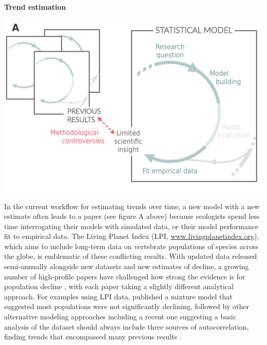 \documentclass[11pt]{article}
\begin{document}
\begin{tcolorbox}[
sharp corners=all,
colback=white,
colframe=black,
size=tight,
boxrule=0.1mm,
grow to left by=+1cm, grow to right by=+1cm,
enlarge top by=-1.2cm,
left=3mm,right=3mm, top = 2mm, bottom = 2mm,
fontupper=\footnotesize
]
{\begin{multicols}{2}

\centerline{\bf Trend estimation}
\vspace*{2mm}
\begin{minipage}[t]{\linewidth}
    \includegraphics[width=\linewidth]{figures/trendestimation_details}

    \vspace*{1mm}
\end{minipage}

In the current workflow for estimating trends over time, a new model with a new estimate often leads to a paper (see figure A above) because ecologists spend less time interrogating their models with simulated data, or their model performance fit to empirical data. 
The Living Planet Index (LPI, \url{www.livingplanetindex.org}), which aims to include long-term data on vertebrate populations of species across the globe, is emblematic of these conflicting results. %
With updated data released semi-annually alongside new datasets and new estimates of decline, a growing number of high-profile papers have challenged how strong the evidence is for population decline \citep{Dornelas2014,gonzalez2016estimating,wagner2021insect,muller2024weather}, with each paper taking a slightly different analytical approach. For examples using LPI data, \citet{Leung2020} published a mixture model that suggested most populations were not significantly declining, followed by other alternative modeling approaches \citep{Buschke2021,puurtinen2022living} including a recent one suggesting a basic analysis of the dataset should always include three sources of autocorrelation, finding trends that encompassed many previous results \citep{Johnson2024}. 



\end{multicols}}
\end{tcolorbox}
\end{document}
